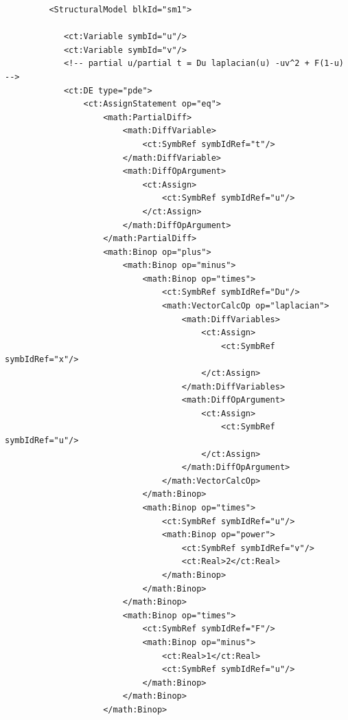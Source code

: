 \lstset{language=XML}
\begin{lstlisting}
         <StructuralModel blkId="sm1">
             
            <ct:Variable symbId="u"/>
            <ct:Variable symbId="v"/>
            <!-- partial u/partial t = Du laplacian(u) -uv^2 + F(1-u) -->
            <ct:DE type="pde">
                <ct:AssignStatement op="eq">
                    <math:PartialDiff>
                        <math:DiffVariable>
                            <ct:SymbRef symbIdRef="t"/>
                        </math:DiffVariable>
                        <math:DiffOpArgument>
                            <ct:Assign>
                                <ct:SymbRef symbIdRef="u"/>
                            </ct:Assign>
                        </math:DiffOpArgument>
                    </math:PartialDiff>
                    <math:Binop op="plus">
                        <math:Binop op="minus">
                            <math:Binop op="times">
                                <ct:SymbRef symbIdRef="Du"/>
                                <math:VectorCalcOp op="laplacian">
                                    <math:DiffVariables>
                                        <ct:Assign>
                                            <ct:SymbRef symbIdRef="x"/>
                                        </ct:Assign>
                                    </math:DiffVariables>
                                    <math:DiffOpArgument>
                                        <ct:Assign>
                                            <ct:SymbRef symbIdRef="u"/>
                                        </ct:Assign>
                                    </math:DiffOpArgument>
                                </math:VectorCalcOp>
                            </math:Binop>
                            <math:Binop op="times">
                                <ct:SymbRef symbIdRef="u"/>
                                <math:Binop op="power">
                                    <ct:SymbRef symbIdRef="v"/>
                                    <ct:Real>2</ct:Real>
                                </math:Binop>
                            </math:Binop>
                        </math:Binop>
                        <math:Binop op="times">
                            <ct:SymbRef symbIdRef="F"/>
                            <math:Binop op="minus">
                                <ct:Real>1</ct:Real>
                                <ct:SymbRef symbIdRef="u"/>
                            </math:Binop>
                        </math:Binop>
                    </math:Binop>

\end{lstlisting}
